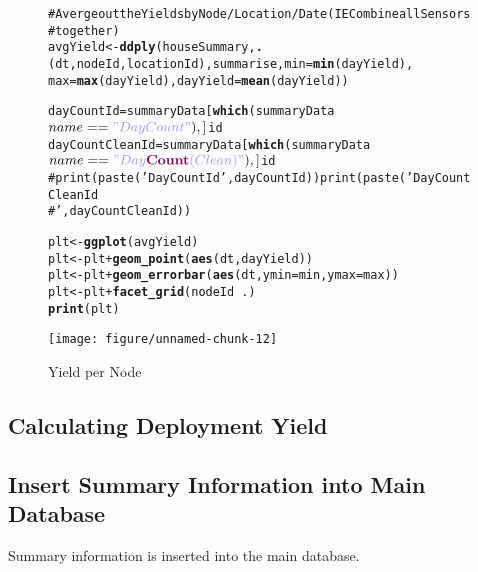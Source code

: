 \documentclass[10pt,a4paper]{article}\usepackage{graphicx, color}
\makeatletter
\def\maxwidth{ %
  \ifdim\Gin@nat@width>\linewidth
    \linewidth
  \else
    \Gin@nat@width
  \fi
}
\newcommand{\hlfunctioncall}[1]{\textcolor[rgb]{0.501960784313725,0,0.329411764705882}{\textbf{#1}}}%
\newcommand{\hlstring}[1]{\textcolor[rgb]{0.6,0.6,1}{#1}}%
\newcommand{\hlcomment}[1]{\textcolor[rgb]{0.180392156862745,0.6,0.341176470588235}{#1}}%
\newenvironment{kframe}{%
 \def\at@end@of@kframe{}%
 \ifinner\ifhmode%
  \def\at@end@of@kframe{\end{minipage}}%
  \begin{minipage}{\columnwidth}%
 \fi\fi%
 \def\FrameCommand##1{\hskip\@totalleftmargin \hskip-\fboxsep
 \colorbox{shadecolor}{##1}\hskip-\fboxsep
     \hskip-\linewidth \hskip-\@totalleftmargin \hskip\columnwidth}%
 \MakeFramed {\advance\hsize-\width
   \@totalleftmargin\z@ \linewidth\hsize
   \@setminipage}}%
 {\par\unskip\endMakeFramed%
 \at@end@of@kframe}
\newenvironment{knitrout}{}{} %
\makeatother
\begin{document}
\begin{figure}
  \label{fig:node-yield}

\begin{knitrout}
\color{fgcolor}\begin{kframe}
\begin{alltt}
\hlcomment{# Averge out the Yields by Node / Location / Date (IE Combine all Sensors}
\hlcomment{# together)}
avgYield <- \hlfunctioncall{ddply}(houseSummary, \hlfunctioncall{.}(dt, nodeId, locationId), summarise, min = \hlfunctioncall{min}(dayYield), 
    max = \hlfunctioncall{max}(dayYield), dayYield = \hlfunctioncall{mean}(dayYield))

dayCountId = summaryData[\hlfunctioncall{which}(summaryData$name == \hlstring{"Day Count"}), ]$id
dayCountCleanId = summaryData[\hlfunctioncall{which}(summaryData$name == \hlstring{"Day \hlfunctioncall{Count} (Clean)"}), 
    ]$id
\hlcomment{# print(paste('Day Count Id ',dayCountId)) print(paste('Day Count Clean Id}
\hlcomment{# ',dayCountCleanId))}

plt <- \hlfunctioncall{ggplot}(avgYield)
plt <- plt + \hlfunctioncall{geom_point}(\hlfunctioncall{aes}(dt, dayYield))
plt <- plt + \hlfunctioncall{geom_errorbar}(\hlfunctioncall{aes}(dt, ymin = min, ymax = max))
plt <- plt + \hlfunctioncall{facet_grid}(nodeId ~ .)
\hlfunctioncall{print}(plt)
\end{alltt}
\end{kframe}
\texttt{[image: figure/unnamed-chunk-12]} 

\end{knitrout}

\caption{Yield per Node}
\end{figure}

\subsection{Calculating Deployment Yield}



\subsection{Insert Summary Information into Main Database}
Summary information is inserted into the main database.

\end{document}
